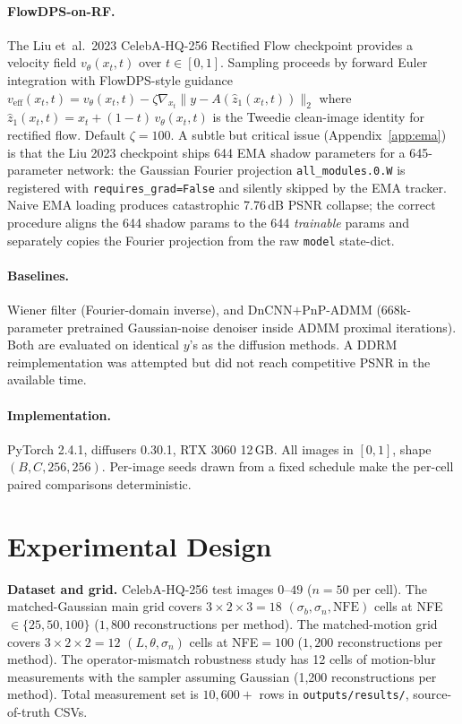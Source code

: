 \documentclass{article}
\begin{document}
\paragraph{FlowDPS-on-RF.} The Liu et~al.~2023 CelebA-HQ-256
Rectified Flow checkpoint provides a velocity field
$v_\theta(x_t, t)$ over $t \in [0,1]$. Sampling proceeds by forward
Euler integration with FlowDPS-style guidance
$v_{\text{eff}}(x_t, t) = v_\theta(x_t, t) - \zeta \nabla_{x_t}
\|y - A(\hat z_1(x_t, t))\|_2$
where $\hat z_1(x_t, t) = x_t + (1-t)\,v_\theta(x_t,t)$ is the
Tweedie clean-image identity for rectified flow. Default $\zeta{=}100$.
A subtle but critical issue (Appendix~\ref{app:ema}) is that the Liu
2023 checkpoint ships 644 EMA shadow parameters for a
645-parameter network: the Gaussian Fourier projection
\texttt{all\_modules.0.W} is registered with
\texttt{requires\_grad=False} and silently skipped by the EMA tracker.
Naive EMA loading produces catastrophic 7.76\,dB PSNR collapse;
the correct procedure aligns the 644 shadow params to the 644
\emph{trainable} params and separately copies the Fourier projection
from the raw \texttt{model} state-dict.

\paragraph{Baselines.} Wiener filter (Fourier-domain inverse), and
DnCNN$+$PnP-ADMM (668k-parameter pretrained Gaussian-noise denoiser
inside ADMM proximal iterations). Both are evaluated on identical
$y$'s as the diffusion methods. A DDRM reimplementation was attempted
but did not reach competitive PSNR in the available time.

\paragraph{Implementation.} PyTorch 2.4.1, diffusers 0.30.1, RTX 3060
12\,GB. All images in $[0,1]$, shape $(B, C, 256, 256)$. Per-image
seeds drawn from a fixed schedule make the per-cell paired comparisons
deterministic.

\section{Experimental Design}

\textbf{Dataset and grid.} CelebA-HQ-256 test images $0$--$49$ ($n{=}50$
per cell). The matched-Gaussian main grid covers $3 \times 2 \times 3 = 18$
$(\sigma_b, \sigma_n, \text{NFE})$ cells at NFE${\in}\{25,50,100\}$
($1{,}800$ reconstructions per method). The matched-motion grid covers
$3\times 2\times 2 = 12$ $(L, \theta, \sigma_n)$ cells at NFE${=}100$
($1{,}200$ reconstructions per method). The operator-mismatch
robustness study has 12 cells of motion-blur measurements with the
sampler assuming Gaussian (1,200 reconstructions per method). Total
measurement set is $10{,}600+$ rows in
\texttt{outputs/results/}, source-of-truth CSVs.
\end{document}
